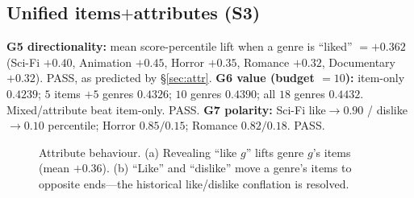 \subsection{Unified items$+$attributes (S3)}
\textbf{G5 directionality:} mean score-percentile lift when a genre is ``liked'' $=+0.362$ (Sci-Fi $+0.40$,
Animation $+0.45$, Horror $+0.35$, Romance $+0.32$, Documentary $+0.32$). PASS, as predicted by \S\ref{sec:attr}.
\textbf{G6 value (budget $=10$):} item-only $0.4239$; $5$ items $+5$ genres $0.4326$; $10$ genres $0.4390$; all
$18$ genres $0.4432$. Mixed/attribute beat item-only. PASS. \textbf{G7 polarity:} Sci-Fi like$\to0.90$ /
dislike$\to0.10$ percentile; Horror $0.85/0.15$; Romance $0.82/0.18$. PASS.

\begin{figure}[h]\centering
\begin{minipage}{0.49\textwidth}\centering
{}
\par{}
\end{minipage}\hfill
\begin{minipage}{0.49\textwidth}\centering
{}
\par{}
\end{minipage}
\caption{Attribute behaviour. (a) Revealing ``like $g$'' lifts genre $g$'s items (mean $+0.36$). (b) ``Like'' and
``dislike'' move a genre's items to opposite ends---the historical like/dislike conflation is resolved.}
\label{fig:s3}
\end{figure}

